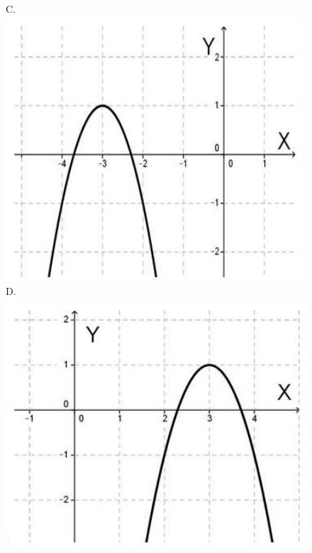 \documentclass[10pt]{article}
\begin{document}
C.\\
\includegraphics[max width=\textwidth, center]{2024_11_21_b31e6de468170710de69g-08(3)}\\
D.\\
\includegraphics[max width=\textwidth, center]{2024_11_21_b31e6de468170710de69g-08(2)}
\end{document}
